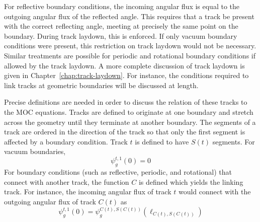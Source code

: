 For reflective boundary conditions, the incoming angular flux is equal to the outgoing angular flux of the reflected angle. This requires that a track be present with the correct reflecting angle, meeting at precisely the same point on the boundary. During track laydown, this is enforced. If only vacuum boundary conditions were present, this restriction on track laydown would not be necessary. Similar treatments are possible for periodic and rotational boundary conditions if allowed by the track laydown.  A more complete discussion of track laydown is given in Chapter~\ref{chap:track-laydown}. For instance, the conditions required to link tracks at geometric boundaries will be discussed at length.

Precise definitions are needed in order to discuss the relation of these tracks to the \ac{MOC} equations. Tracks are defined to originate at one boundary and stretch across the geometry until they terminate at another boundary. The segments of a track are ordered in the direction of the track so that only the first segment is affected by a boundary condition. Track $t$ is defined to have $S(t)$ segments. For vacuum boundaries,
\begin{dmath}
	\psi_g^{t,1}(0) = 0
\end{dmath}
For boundary conditions (such as reflective, periodic, and rotational) that connect with another track, the function $C$ is defined which yields the linking track. For instance, the incoming angular flux of track $t$ would connect with the outgoing angular flux of track $C(t)$ as
\begin{dmath}
	\psi_g^{t,1}(0) = \psi_g^{C(t),S(C(t))}(\ell_{C(t),S(C(t))})
	\label{eqn:linking-bc}
\end{dmath}


